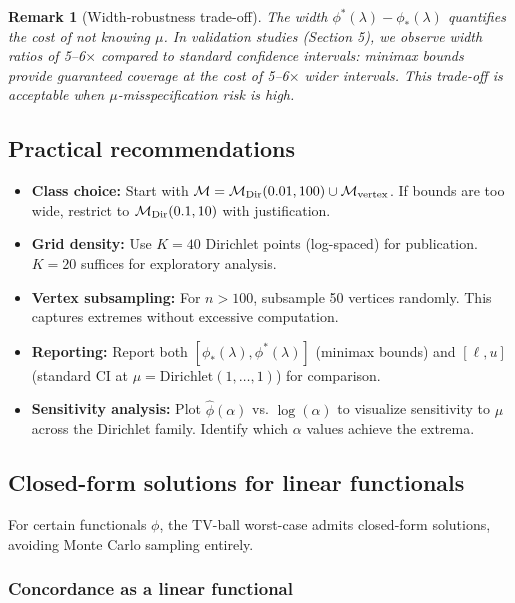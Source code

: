 \documentclass{article}
\newtheorem{remark}{Remark}
\begin{document}
\begin{remark}[Width-robustness trade-off]
The width $\phi^*(\lambda) - \phi_*(\lambda)$ quantifies the cost of not knowing $\mu$. In validation studies (Section 5), we observe width ratios of 5--6$\times$ compared to standard confidence intervals: minimax bounds provide guaranteed coverage at the cost of 5--6$\times$ wider intervals. This trade-off is acceptable when $\mu$-misspecification risk is high.
\end{remark}

\subsection{Practical recommendations}

\begin{itemize}
    \item \textbf{Class choice:} Start with $\mathcal{M} = \mathcal{M}_{\text{Dir}}(0.01, 100) \cup \mathcal{M}_{\text{vertex}}$. If bounds are too wide, restrict to $\mathcal{M}_{\text{Dir}}(0.1, 10)$ with justification.

    \item \textbf{Grid density:} Use $K = 40$ Dirichlet points (log-spaced) for publication. $K = 20$ suffices for exploratory analysis.

    \item \textbf{Vertex subsampling:} For $n > 100$, subsample 50 vertices randomly. This captures extremes without excessive computation.

    \item \textbf{Reporting:} Report both $[\phi_*(\lambda), \phi^*(\lambda)]$ (minimax bounds) and $[\ell, u]$ (standard CI at $\mu = \text{Dirichlet}(1, \ldots, 1)$) for comparison.

    \item \textbf{Sensitivity analysis:} Plot $\hat{\phi}(\alpha)$ vs. $\log(\alpha)$ to visualize sensitivity to $\mu$ across the Dirichlet family. Identify which $\alpha$ values achieve the extrema.
\end{itemize}

\subsection{Closed-form solutions for linear functionals}

For certain functionals $\phi$, the TV-ball worst-case admits closed-form solutions, avoiding Monte Carlo sampling entirely.

\subsubsection{Concordance as a linear functional}
\end{document}
